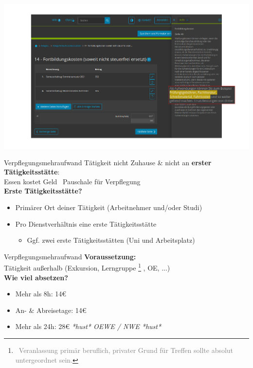 \documentclass[draft]{beamer}
\newcommand{\n}{\hfill\\\vspace{0.25cm}}
\let\oldfootnote\footnote
\renewcommand{\footnote}[1]
{%
	\oldfootnote
	{
		\tiny
		\textcolor{gray}{\ #1}
	}%
}
\begin{document}
			\begin{frame}
				\begin{center}
					\vspace{-0.6cm}
					\hspace*{-0.91cm}
					\includegraphics[scale=0.24]{images/elster-fortbildungskosten-3}
				\end{center}
			\end{frame}
		
			\begin{frame}{Verpflegungsmehraufwand}
				Tätigkeit nicht Zuhause \& nicht an \textbf{erster Tätigkeitsstätte}:\\
				Essen kostet Geld \textrightarrow\ Pauschale für Verpflegung\n
				\textbf{Erste Tätigkeitsstätte?}
				\begin{itemize}
					\item Primärer Ort deiner Tätigkeit (Arbeitnehmer und/oder Studi)
					\item Pro Dienstverhältnis eine erste Tätigkeitsstätte
					\begin{itemize}
						\item Ggf. zwei erste Tätigkeitsstätten (Uni und Arbeitsplatz)
					\end{itemize}
				\end{itemize}
			\end{frame}
				
			\begin{frame}{Verpflegungsmehraufwand}
				\textbf{Voraussetzung:}\\
				Tätigkeit außerhalb (Exkursion, Lerngruppe\footnote{Veranlassung primär beruflich, privater Grund für Treffen sollte absolut untergeordnet sein.}, OE, ...)\n
				\textbf{Wie viel absetzen?}
				\begin{itemize}
					\item Mehr als 8h: 14€
					\item An- \& Abreisetage: 14€
					\item Mehr als 24h: 28€ {\tiny \textit{*hust* OEWE / NWE *hust*}}
				\end{itemize}
			\end{frame}
		
\end{document}
